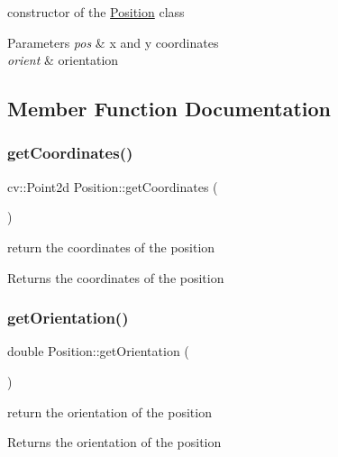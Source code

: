 constructor of the \mbox{\hyperlink{class_position}{Position}} class 


\begin{DoxyParams}{Parameters}
{\em pos} & x and y coordinates \\
\hline
{\em orient} & orientation \\
\hline
\end{DoxyParams}


\subsection{Member Function Documentation}
\mbox{\label{class_position_a9de96881a3ea441b4cfb26339172dc6f}} 
\subsubsection{\texorpdfstring{get\+Coordinates()}{getCoordinates()}}
{\footnotesize\ttfamily cv\+::\+Point2d Position\+::get\+Coordinates (\begin{DoxyParamCaption}{ }\end{DoxyParamCaption})}



return the coordinates of the position 

\begin{DoxyReturn}{Returns}
the coordinates of the position 
\end{DoxyReturn}
\mbox{\label{class_position_af0b1158a379d54dd7ee08164eafe262e}} 
\subsubsection{\texorpdfstring{get\+Orientation()}{getOrientation()}}
{\footnotesize\ttfamily double Position\+::get\+Orientation (\begin{DoxyParamCaption}{ }\end{DoxyParamCaption})}



return the orientation of the position 

\begin{DoxyReturn}{Returns}
the orientation of the position 
\end{DoxyReturn}
\mbox{\label{class_position_acf00d240f456cc9b2c2910e803f53605}} 
